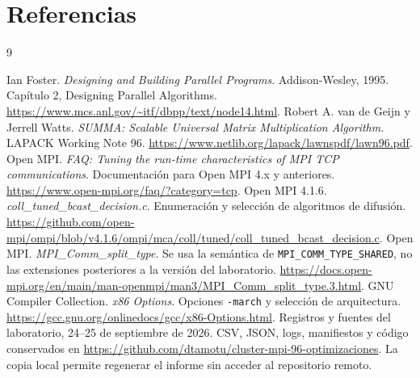 \section{Referencias}
\begingroup
\renewcommand{\refname}{}
\begin{thebibliography}{9}
\raggedright
{} Ian Foster. \emph{Designing and Building Parallel Programs}. Addison-Wesley, 1995. Capítulo 2, Designing Parallel Algorithms. \url{https://www.mcs.anl.gov/~itf/dbpp/text/node14.html}.
 Robert A. van de Geijn y Jerrell Watts. \emph{SUMMA: Scalable Universal Matrix Multiplication Algorithm}. LAPACK Working Note 96. \url{https://www.netlib.org/lapack/lawnspdf/lawn96.pdf}.
 Open MPI. \emph{FAQ: Tuning the run-time characteristics of MPI TCP communications}. Documentación para Open MPI 4.x y anteriores. \url{https://www.open-mpi.org/faq/?category=tcp}.
 Open MPI 4.1.6. \emph{coll\_tuned\_bcast\_decision.c}. Enumeración y selección de algoritmos de difusión. \url{https://github.com/open-mpi/ompi/blob/v4.1.6/ompi/mca/coll/tuned/coll_tuned_bcast_decision.c}.
 Open MPI. \emph{MPI\_Comm\_split\_type}. Se usa la semántica de \texttt{MPI\_COMM\_TYPE\_SHARED}, no las extensiones posteriores a la versión del laboratorio. \url{https://docs.open-mpi.org/en/main/man-openmpi/man3/MPI_Comm_split_type.3.html}.
 GNU Compiler Collection. \emph{x86 Options}. Opciones \texttt{-march} y selección de arquitectura. \url{https://gcc.gnu.org/onlinedocs/gcc/x86-Options.html}.
 Registros y fuentes del laboratorio, 24--25 de septiembre de 2026. CSV, JSON, logs, manifiestos y código conservados en \url{https://github.com/dtamotu/cluster-mpi-96-optimizaciones}. La copia local permite regenerar el informe sin acceder al repositorio remoto.
\end{thebibliography}
\endgroup
